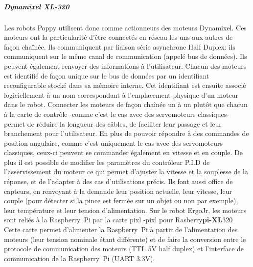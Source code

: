                \subparagraph{Dynamixel XL-320}
                    Les robots Poppy utilisent donc comme actionneurs des moteurs Dynamixel.
                    Ces moteurs ont la particularité d'être connectés en réseau les uns aux autres de façon chaînée.  Ils communiquent par liaison série asynchrone Half Duplex: ils communiquent sur le même canal de communication (appelé bus de données). Ils peuvent également renvoyer des informations à l'utilisateur.
                    Chacun des moteurs est identifié de façon unique sur le bus de données par un identifiant reconfigurable stocké dans sa mémoire interne.
                    Cet identifiant est ensuite associé logiciellement à un nom correspondant à l'emplacement physique d'un moteur dans le robot.
                    Connecter les moteurs de façon chaînée un à un plutôt que chacun à la carte de contrôle -comme c'est le cas avec des servomoteurs classiques- permet de réduire la longueur des câbles, de faciliter leur passage et leur branchement pour l'utilisateur.
                    En plus de pouvoir répondre à des commandes de position angulaire, comme c'est uniquement le cas avec des servomoteurs classiques, ceux-ci peuvent se commander également en vitesse et en couple. De plus il est possible de modifier les paramètres du contrôleur P.I.D de l'asservissement du moteur ce qui permet d'ajuster la vitesse et la souplesse de la réponse, et de l'adapter à des cas d'utilisations précis.
                    Ils font aussi office de capteurs, en renvoyant à la demande leur position actuelle, leur vitesse, leur couple (pour détecter si la pince est fermée sur un objet ou non par exemple), leur température et leur tension d'alimentation.
                    Sur le robot ErgoJr, les moteurs sont reliés à la Raspberry~Pi par la carte pixl -pixl pour Rasberry\textbf{pi-XL}320%
                    Cette carte permet d’alimenter la Raspberry~Pi à partir de l’alimentation des moteurs (leur tension nominale étant différente) et de faire la conversion entre le protocole de communication des moteurs (TTL 5V half duplex) et l'interface de communication de la Raspberry~Pi (UART 3.3V).

